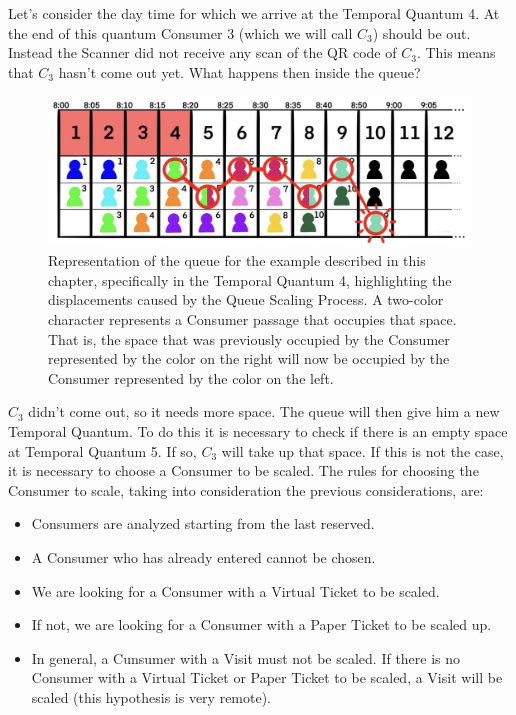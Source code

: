 \documentclass[a4paper, 12pt, oneside, table]{article}
\begin{document}
Let's consider the day time for which we arrive at the Temporal Quantum 4. At the end of this quantum Consumer 3 (which we will call $ C_3 $) should be out. Instead the Scanner did not receive any scan of the QR code of $ C_3 $. This means that $ C_3 $ hasn't come out yet. What happens then inside the queue?
\begin{figure}[hbt]
\centering
	\centering
  	\includegraphics[height=0.15\textheight, scale=0.2, keepaspectratio]{img/queue/queue_ex2.jpg} 
	\caption{Representation of the queue for the example described in this chapter, specifically in the Temporal Quantum 4, highlighting the displacements caused by the Queue Scaling Process. A two-color character represents a Consumer passage that occupies that space. That is, the space that was previously occupied by the Consumer represented by the color on the right will now be occupied by the Consumer represented by the color on the left.}
 	\label{queueex2}
\end{figure}
$ C_3 $ didn't come out, so it needs more space. The queue will then give him a new Temporal Quantum. To do this it is necessary to check if there is an empty space at Temporal Quantum 5. If so, $ C_3 $ will take up that space. If this is not the case, it is necessary to choose a Consumer to be scaled. The rules for choosing the Consumer to scale, taking into consideration the previous considerations, are:
\begin{itemize}
    \item Consumers are analyzed starting from the last reserved.
    \item A Consumer who has already entered cannot be chosen.
    \item We are looking for a Consumer with a Virtual Ticket to be scaled.
    \item If not, we are looking for a Consumer with a Paper Ticket to be scaled up.
    \item In general, a Cunsumer with a Visit must not be scaled. If there is no Consumer with a Virtual Ticket or Paper Ticket to be scaled, a Visit will be scaled (this hypothesis is very remote).
\end{itemize}
\end{document}

